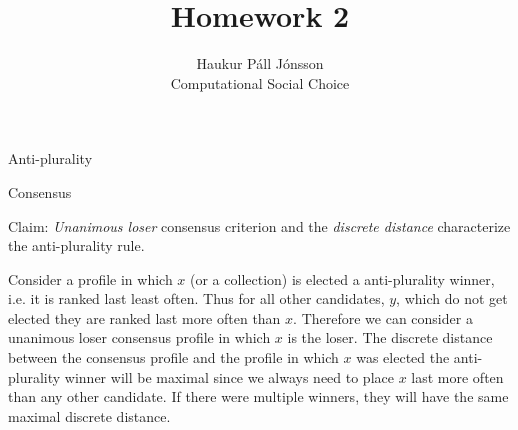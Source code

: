 \documentclass[12pt]{article}
\newenvironment{question}[2][Question]{\begin{trivlist}
\item[\hskip \labelsep {\bfseries #1}\hskip \labelsep {\bfseries #2.}]}{\end{trivlist}}
\newenvironment{answer}[2][Answer]{\begin{trivlist}
\item[\hskip \labelsep {\bfseries #1}\hskip \labelsep {\bfseries #2:}]}{\end{trivlist}}
\begin{document}
\renewcommand{\theenumi}{\roman{enumi}}

\let\oldsum\sum
\renewcommand{\sum}[3]{\oldsum\limits_{#1}^{#2}#3}
\let\oldprod\prod
\renewcommand{\prod}[3]{\oldprod\limits_{#1}^{#2}#3}

\newcommand\Dunion{
  \mathop{\mathchoice
    {\ooalign{$\displaystyle\bigcup$\cr\hss\scalebox{.65}{\raisebox{0.45ex}{\sffamily +}}\hss}}
    {\ooalign{$\textstyle\bigcup$\cr\hss\scalebox{.9}{\raisebox{0.5ex}{\tiny\sffamily +}}\hss}}
    {\ooalign{$\scriptstyle\bigcup$\cr\hss\scalebox{.45}{\raisebox{0.3ex}{\sffamily +}}\hss}}
    {\ooalign{$\scriptscriptstyle\bigcup$\cr\hss\scalebox{.38}{\raisebox{0.3ex}{\sffamily +}}\hss}}
    }
}

\title{Homework 2}
\author{Haukur Páll Jónsson\\
Computational Social Choice}

\maketitle

\begin{question}{1}{Anti-plurality}


\end{question}

\begin{answer}{a)}{Consensus}

Claim: \textit{Unanimous loser} consensus criterion and the \textit{discrete distance} characterize the anti-plurality rule.

Consider a profile in which $x$ (or a collection) is elected a anti-plurality winner, i.e. it is ranked last least often. Thus for all other candidates, $y$, which do not get elected they are ranked last more often than $x$. Therefore we can consider a unanimous loser consensus profile in which $x$ is the loser. The discrete distance between the consensus profile and the profile in which $x$ was elected the anti-plurality winner will be maximal since we always need to place $x$ last more often than any other candidate. If there were multiple winners, they will have the same maximal discrete distance.
\end{answer}
\end{document}
